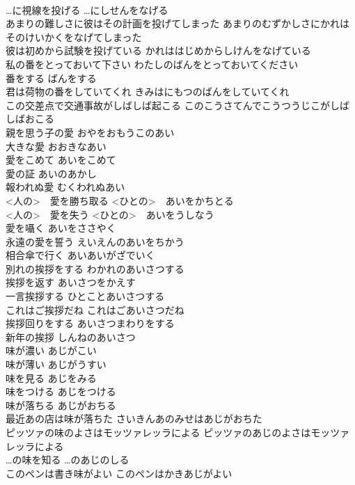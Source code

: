 \documentclass[8pt]{extreport}
\begin{document}
\begin{CJK}{UTF8}{min}
\\	…に視線を投げる	…にしせんをなげる	
\\	あまりの難しさに彼はその計画を投げてしまった	あまりのむずかしさにかれはそのけいかくをなげてしまった	
\\	彼は初めから試験を投げている	かれははじめからしけんをなげている	
\\	私の番をとっておいて下さい	わたしのばんをとっておいてください	
\\	番をする	ばんをする	
\\	君は荷物の番をしていてくれ	きみはにもつのばんをしていてくれ	
\\	この交差点で交通事故がしばしば起こる	このこうさてんでこうつうじこがしばしばおこる	
\\	親を思う子の愛	おやをおもうこのあい	
\\	大きな愛	おおきなあい	
\\	愛をこめて	あいをこめて	
\\	愛の証	あいのあかし	
\\	報われぬ愛	むくわれぬあい	
\\	<人の>　愛を勝ち取る	<ひとの>　あいをかちとる	
\\	<人の>　愛を失う	<ひとの>　あいをうしなう	
\\	愛を囁く	あいをささやく	
\\	永遠の愛を誓う	えいえんのあいをちかう	
\\	相合傘で行く	あいあいがざでいく	
\\	別れの挨拶をする	わかれのあいさつする	
\\	挨拶を返す	あいさつをかえす	
\\	一言挨拶する	ひとことあいさつする	
\\	これはご挨拶だね	これはごあいさつだね	
\\	挨拶回りをする	あいさつまわりをする	
\\	新年の挨拶	しんねのあいさつ	
\\	味が濃い	あじがこい	
\\	味が薄い	あじがうすい	
\\	味を見る	あじをみる	
\\	味をつける	あじをつける	
\\	味が落ちる	あじがおちる	
\\	最近あの店は味が落ちた	さいきんあのみせはあじがおちた	
\\	ピッツァの味のよさはモッツァレッラによる	ピッツァのあじのよさはモッツァレッラによる	
\\	…の味を知る	…のあじのしる	
\\	このペンは書き味がよい	このペンはかきあじがよい	

\end{CJK}
\end{document}

